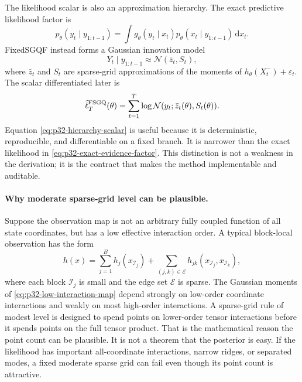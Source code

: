 \documentclass[11pt]{article}
\numberwithin{equation}{section}
\newcommand{\N}{\mathcal N}
\newcommand{\dd}{\,\mathrm d}
\newcommand{\ellhat}{\widehat\ell}
\begin{document}
The likelihood scalar is also an approximation hierarchy.  The exact
predictive likelihood factor is
\begin{equation}
  p_\theta(y_t\mid y_{1:t-1})
  =
  \int g_\theta(y_t\mid x_t)
  p_\theta(x_t\mid y_{1:t-1})\dd x_t.
  \label{eq:p32-exact-evidence-factor}
\end{equation}
FixedSGQF instead forms a Gaussian innovation model
\begin{equation}
  Y_t\mid y_{1:t-1}
  \approx
  \N(\bar z_t,S_t),
  \label{eq:p32-gaussian-innovation-model}
\end{equation}
where \(\bar z_t\) and \(S_t\) are sparse-grid approximations of the moments of
\(h_\theta(X_t^-)+\varepsilon_t\).  The scalar differentiated later is
\begin{equation}
  \ellhat_T^{\rm FSGQ}(\theta)
  =
  \sum_{t=1}^T
  \log \N(y_t;\bar z_t(\theta),S_t(\theta)).
  \label{eq:p32-hierarchy-scalar}
\end{equation}
Equation \eqref{eq:p32-hierarchy-scalar} is useful because it is deterministic,
reproducible, and differentiable on a fixed branch.  It is narrower than the
exact likelihood in \eqref{eq:p32-exact-evidence-factor}.  This distinction is
not a weakness in the derivation; it is the contract that makes the method
implementable and auditable.

\paragraph{Why moderate sparse-grid level can be plausible.}
Suppose the observation map is not an arbitrary fully coupled function of all
state coordinates, but has a low effective interaction order.  A typical
block-local observation has the form
\begin{equation}
  h(x)
  =
  \sum_{j=1}^{B} h_j(x_{\mathcal I_j})
  +\sum_{(j,k)\in\mathcal E} h_{jk}(x_{\mathcal I_j},x_{\mathcal I_k}),
  \label{eq:p32-low-interaction-map}
\end{equation}
where each block \(\mathcal I_j\) is small and the edge set \(\mathcal E\) is
sparse.  The Gaussian moments of \eqref{eq:p32-low-interaction-map} depend
strongly on low-order coordinate interactions and weakly on most high-order
interactions.  A sparse-grid rule of modest level is designed to spend points
on lower-order tensor interactions before it spends points on the full tensor
product.  That is the mathematical reason the point count can be plausible.
It is not a theorem that the posterior is easy.  If the likelihood has
important all-coordinate interactions, narrow ridges, or separated modes, a
fixed moderate sparse grid can fail even though its point count is attractive.
\end{document}
